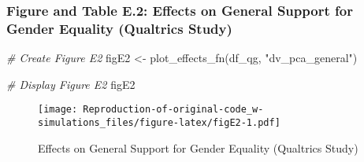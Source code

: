 \documentclass[
]{article}
\newenvironment{Shaded}{\begin{snugshade}}{\end{snugshade}}
\newcommand{\CommentTok}[1]{\textcolor[rgb]{0.56,0.35,0.01}{\textit{#1}}}
\newcommand{\FunctionTok}[1]{\textcolor[rgb]{0.00,0.00,0.00}{#1}}
\newcommand{\NormalTok}[1]{#1}
\newcommand{\OtherTok}[1]{\textcolor[rgb]{0.56,0.35,0.01}{#1}}
\newcommand{\SpecialCharTok}[1]{\textcolor[rgb]{0.00,0.00,0.00}{#1}}
\newcommand{\StringTok}[1]{\textcolor[rgb]{0.31,0.60,0.02}{#1}}
\begin{document}
\hypertarget{figure-and-table-e.2-effects-on-general-support-for-gender-equality-qualtrics-study}{%
\subsubsection{Figure and Table E.2: Effects on General Support for
Gender Equality (Qualtrics
Study)}\label{figure-and-table-e.2-effects-on-general-support-for-gender-equality-qualtrics-study}}

\begin{Shaded}
\begin{Highlighting}[]
\CommentTok{\# Create Figure E2}
\NormalTok{figE2 }\OtherTok{\textless{}{-}} \FunctionTok{plot\_effects\_fn}\NormalTok{(df\_qg, }\StringTok{"dv\_pca\_general"}\NormalTok{)}

\CommentTok{\# Display Figure E2}
\NormalTok{figE2 }
\end{Highlighting}
\end{Shaded}

\begin{figure}
\centering
\texttt{[image: Reproduction-of-original-code\_w-simulations\_files/figure-latex/figE2-1.pdf]}
\caption{Effects on General Support for Gender Equality (Qualtrics
Study)}
\end{figure}

\begin{Shaded}
\end{Shaded}
\end{document}
